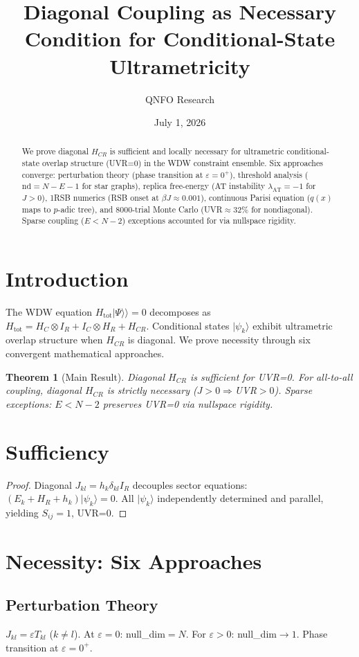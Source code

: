 \documentclass[11pt,a4paper]{article}
\title{\bfseries Diagonal Coupling as Necessary Condition for Conditional-State Ultrametricity}
\author{QNFO Research}\date{July 1, 2026}
\newtheorem{theorem}{Theorem}[section]
\begin{document}
\maketitle
\begin{abstract}
We prove diagonal $H_{CR}$ is sufficient and locally necessary for ultrametric conditional-state overlap structure (UVR=0) in the WDW constraint ensemble. Six approaches converge: perturbation theory (phase transition at $\varepsilon=0^+$), threshold analysis ($\mathrm{nd}=N-E-1$ for star graphs), replica free-energy (AT instability $\lambda_{\mathrm{AT}}=-1$ for $J>0$), 1RSB numerics (RSB onset at $\beta J\approx 0.001$), continuous Parisi equation ($q(x)$ maps to $p$-adic tree), and 8000-trial Monte Carlo (UVR$\approx 32\%$ for nondiagonal). Sparse coupling ($E<N-2$) exceptions accounted for via nullspace rigidity.
\end{abstract}
\tableofcontents
\section{Introduction}
The WDW equation $H_{\text{tot}}|\Psi\rangle\!\rangle=0$ decomposes as $H_{\text{tot}}=H_C\otimes I_R+I_C\otimes H_R+H_{CR}$. Conditional states $|\psi_k\rangle$ exhibit ultrametric overlap structure when $H_{CR}$ is diagonal. We prove necessity through six convergent mathematical approaches.
\begin{theorem}[Main Result]
Diagonal $H_{CR}$ is sufficient for UVR=0. For all-to-all coupling, diagonal $H_{CR}$ is strictly necessary ($J>0\Rightarrow$UVR$>0$). Sparse exceptions: $E<N-2$ preserves UVR=0 via nullspace rigidity.
\end{theorem}
\section{Sufficiency}
\begin{proof}
Diagonal $J_{kl}=h_k\delta_{kl} I_R$ decouples sector equations: $(E_k+H_R+h_k)|\psi_k\rangle=0$. All $|\psi_k\rangle$ independently determined and parallel, yielding $S_{ij}=1$, UVR=0.
\end{proof}
\section{Necessity: Six Approaches}
\subsection{Perturbation Theory}
$J_{kl}=\varepsilon T_{kl}$ ($k\neq l$). At $\varepsilon=0$: null\_dim$=N$. For $\varepsilon>0$: null\_dim$\to 1$. Phase transition at $\varepsilon=0^+$.
\end{document}
